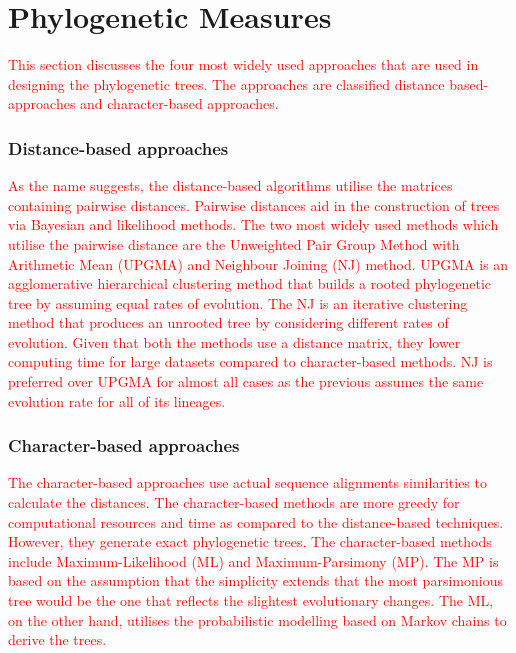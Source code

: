 \chapter{Phylogenetic Measures}
 \setcounter{page}{16}

\textcolor{red}{This section discusses the four most widely used approaches that are used in designing the phylogenetic trees. The approaches are classified distance based-approaches and character-based approaches.}

\subsection{Distance-based approaches}

\textcolor{red}{As the name suggests, the distance-based algorithms utilise the matrices containing pairwise distances. Pairwise distances aid in the construction of trees via Bayesian and likelihood methods. The two most widely used methods which utilise the pairwise distance are the Unweighted Pair Group Method with Arithmetic Mean (UPGMA) and Neighbour Joining (NJ) method. UPGMA is an agglomerative hierarchical clustering method that builds a rooted phylogenetic tree by assuming equal rates of evolution. The NJ is an iterative clustering method that produces an unrooted tree by considering different rates of evolution. Given that both the methods use a distance matrix, they lower computing time for large datasets compared to character-based methods. NJ is preferred over UPGMA for almost all cases as the previous assumes the same evolution rate for all of its lineages.}

\subsection{Character-based approaches}

\textcolor{red}{The character-based approaches use actual sequence alignments similarities to calculate the distances. The character-based methods are more greedy for computational resources and time as compared to the distance-based techniques. However, they generate exact phylogenetic trees. The character-based methods include Maximum-Likelihood (ML) and Maximum-Parsimony (MP). The MP is based on the assumption that the simplicity extends that the most parsimonious tree would be the one that reflects the slightest evolutionary changes. The ML, on the other hand, utilises the probabilistic modelling based on Markov chains to derive the trees.}

